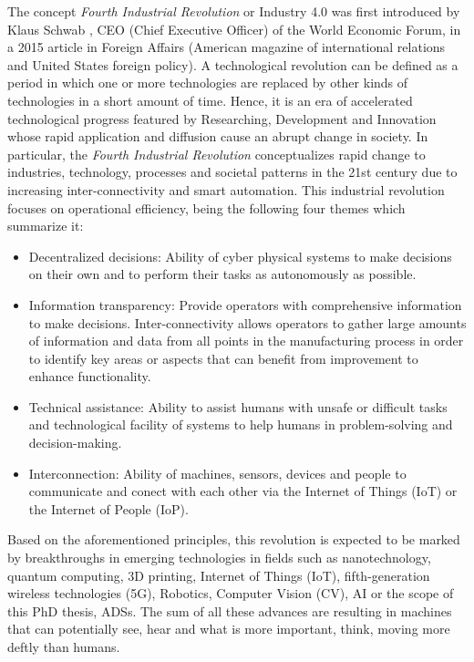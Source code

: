 The concept \textit{Fourth Industrial Revolution} or Industry 4.0  was first introduced by Klaus Schwab , CEO (Chief Executive Officer) of the World Economic Forum, in a 2015 article in Foreign Affairs (American magazine of international relations and United States foreign policy). A technological revolution can be defined as a period in which one or more technologies are replaced by other kinds of technologies in a short amount of time. Hence, it is an era of accelerated technological progress featured by Researching, Development and Innovation whose rapid application and diffusion cause an abrupt change in society. In particular, the \textit{Fourth Industrial Revolution} conceptualizes rapid change to industries, technology, processes and societal patterns in the 21st century due to increasing inter-connectivity and smart automation. This industrial revolution focuses on operational efficiency, being the following four themes which summarize it: \\

\begin{itemize}
	\item Decentralized decisions: Ability of cyber physical systems to make decisions on their own and to perform their tasks as autonomously as possible.
	\item Information transparency: Provide operators with comprehensive information to make decisions. Inter-connectivity allows operators to gather large amounts of information and data from all points in the manufacturing process in order to identify key areas or aspects that can benefit from improvement to enhance functionality.
	\item Technical assistance: Ability to assist humans with unsafe or difficult tasks and technological facility of systems to help humans in problem-solving and decision-making.
	\item Interconnection: Ability of machines, sensors, devices and people to communicate and conect with each other via the Internet of Things (IoT) or the Internet of People (IoP).
\end{itemize}

Based on the aforementioned principles, this revolution is expected to be marked by breakthroughs in emerging technologies in fields such as nanotechnology, quantum computing, 3D printing, Internet of Things (IoT), fifth-generation wireless technologies (5G), Robotics, Computer Vision (CV), \ac{AI} or the scope of this PhD thesis, \acp{ADS}. The sum of all these advances are resulting in machines that can potentially see, hear and what is more important, think, moving more deftly than humans. \\

